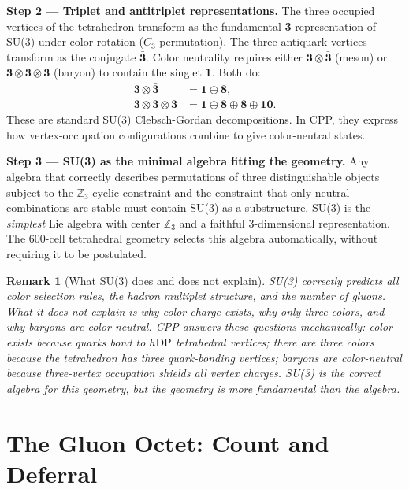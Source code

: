 \documentclass[12pt]{article}
\newtheorem{remark}[theorem]{Remark}
\newcommand{\hDP}{h\mathrm{DP}}
\begin{document}
\textbf{Step 2 — Triplet and antitriplet representations.}
The three occupied vertices of the tetrahedron transform as the
fundamental \textbf{3} representation of SU(3) under color rotation
($C_3$ permutation).  The three antiquark vertices transform as the
conjugate $\bar{\textbf{3}}$.  Color neutrality requires either
$\mathbf{3} \otimes \bar{\mathbf{3}}$ (meson) or
$\mathbf{3} \otimes \mathbf{3} \otimes \mathbf{3}$ (baryon) to
contain the singlet \textbf{1}.  Both do:
\begin{align}
\mathbf{3} \otimes \bar{\mathbf{3}} &= \mathbf{1} \oplus \mathbf{8},
\label{eq:meson_decomp}\\
\mathbf{3} \otimes \mathbf{3} \otimes \mathbf{3} &=
\mathbf{1} \oplus \mathbf{8} \oplus \mathbf{8} \oplus \mathbf{10}.
\label{eq:baryon_decomp}
\end{align}
These are standard SU(3) Clebsch-Gordan decompositions.  In CPP, they
express how vertex-occupation configurations combine to give
color-neutral states.

\textbf{Step 3 — SU(3) as the minimal algebra fitting the geometry.}
Any algebra that correctly describes permutations of three
distinguishable objects subject to the $\mathbb{Z}_3$ cyclic
constraint and the constraint that only neutral combinations are
stable must contain SU(3) as a substructure.  SU(3) is the
\emph{simplest} Lie algebra with center $\mathbb{Z}_3$ and a faithful
3-dimensional representation.  The 600-cell tetrahedral geometry
selects this algebra automatically, without requiring it to be
postulated.

\begin{remark}[What SU(3) does and does not explain]
SU(3) correctly predicts all color selection rules, the hadron
multiplet structure, and the number of gluons.  What it does not
explain is \emph{why} color charge exists, \emph{why} only three
colors, and \emph{why} baryons are color-neutral.  CPP answers these
questions mechanically: color exists because quarks bond to $\hDP$
tetrahedral vertices; there are three colors because the tetrahedron
has three quark-bonding vertices; baryons are color-neutral because
three-vertex occupation shields all vertex charges.  SU(3) is the
correct algebra for this geometry, but the geometry is more
fundamental than the algebra.
\end{remark}

\section{The Gluon Octet: Count and Deferral}
\label{sec:gluons}
\end{document}
